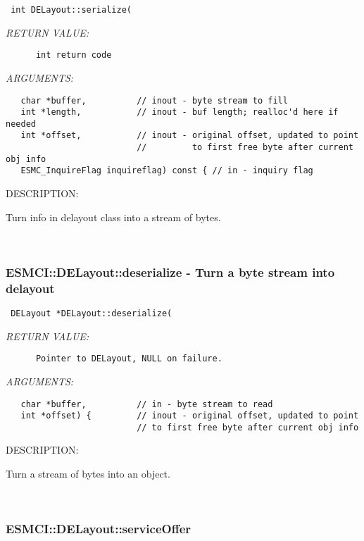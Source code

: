   
\begin{verbatim} int DELayout::serialize(\end{verbatim}{\em RETURN VALUE:}
\begin{verbatim}      int return code\end{verbatim}{\em ARGUMENTS:}
\begin{verbatim}   char *buffer,          // inout - byte stream to fill
   int *length,           // inout - buf length; realloc'd here if needed
   int *offset,           // inout - original offset, updated to point
                          //         to first free byte after current obj info
   ESMC_InquireFlag inquireflag) const { // in - inquiry flag\end{verbatim}
{\sf DESCRIPTION:\\ }


      Turn info in delayout class into a stream of bytes.
   
 
\mbox{}\hrulefill\
 
\subsubsection [ESMCI::DELayout::deserialize] {ESMCI::DELayout::deserialize - Turn a byte stream into delayout}


  
\begin{verbatim} DELayout *DELayout::deserialize(\end{verbatim}{\em RETURN VALUE:}
\begin{verbatim}      Pointer to DELayout, NULL on failure.\end{verbatim}{\em ARGUMENTS:}
\begin{verbatim}   char *buffer,          // in - byte stream to read
   int *offset) {         // inout - original offset, updated to point
                          // to first free byte after current obj info\end{verbatim}
{\sf DESCRIPTION:\\ }


      Turn a stream of bytes into an object.
   
 
\mbox{}\hrulefill\
 
\subsubsection [ESMCI::DELayout::serviceOffer] {ESMCI::DELayout::serviceOffer}


